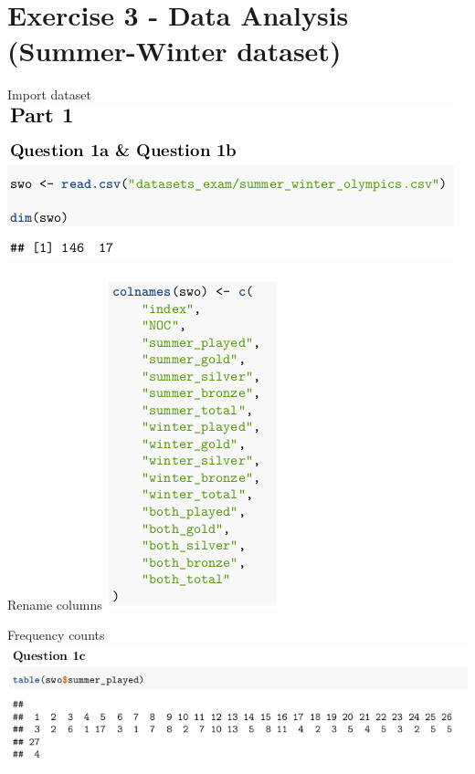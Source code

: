 \documentclass{beamer}
\begin{document}
\section{Exercise 3 - Data Analysis\\(Summer-Winter dataset)}

\begin{frame}{Import dataset}
    \includegraphics[width=.8\textwidth]{img/ex3_screenshot01.png}
\end{frame}

\begin{frame}{Rename columns}
    \includegraphics[height=.9\textheight]{img/ex3_screenshot02.png}
\end{frame}

\begin{frame}{Frequency counts}
    \includegraphics[width=.8\textwidth]{img/ex3_screenshot03.png}
\end{frame}
\end{document}
